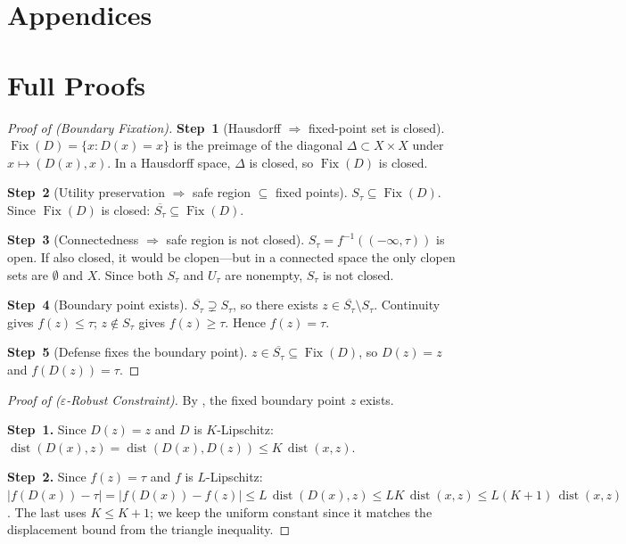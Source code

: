 \documentclass[11pt]{article}
\newcommand{\cl}[1]{\overline{#1}}
\newcommand{\Fix}{\operatorname{Fix}}
\newcommand{\dist}{\operatorname{dist}}
\begin{document}
\newpage
\appendix
\section*{Appendices}

\section{Full Proofs}
\label{app:proofs}

\begin{proof}[Proof of  (Boundary Fixation)]
\textbf{Step~1} (Hausdorff $\Rightarrow$ fixed-point set is closed).
$\Fix(D) = \{x : D(x) = x\}$ is the preimage of the diagonal
$\Delta \subset X \times X$ under $x \mapsto (D(x), x)$. In a
Hausdorff space, $\Delta$ is closed, so $\Fix(D)$ is closed.

\textbf{Step~2} (Utility preservation $\Rightarrow$ safe region
$\subseteq$ fixed points).
$S_\tau \subseteq \Fix(D)$. Since $\Fix(D)$ is closed:
$\cl{S_\tau} \subseteq \Fix(D)$.

\textbf{Step~3} (Connectedness $\Rightarrow$ safe region is not closed).
$S_\tau = f^{-1}((-\infty,\tau))$ is open. If also closed, it would be
clopen---but in a connected space the only clopen sets are $\emptyset$
and $X$. Since both $S_\tau$ and $U_\tau$ are nonempty, $S_\tau$ is not
closed.

\textbf{Step~4} (Boundary point exists).
$\cl{S_\tau} \supsetneq S_\tau$, so there exists
$z \in \cl{S_\tau} \setminus S_\tau$. Continuity gives
$f(z) \leq \tau$; $z \notin S_\tau$ gives $f(z) \geq \tau$. Hence
$f(z) = \tau$.

\textbf{Step~5} (Defense fixes the boundary point).
$z \in \cl{S_\tau} \subseteq \Fix(D)$, so $D(z) = z$ and
$f(D(z)) = \tau$.
\end{proof}

\begin{proof}[Proof of  ($\varepsilon$-Robust Constraint)]
By , the fixed boundary point $z$ exists.

\textbf{Step~1.} Since $D(z) = z$ and $D$ is $K$-Lipschitz:
$\dist(D(x), z) = \dist(D(x), D(z)) \leq K\,\dist(x, z)$.

\textbf{Step~2.} Since $f(z) = \tau$ and $f$ is $L$-Lipschitz:
$|f(D(x)) - \tau| = |f(D(x)) - f(z)| \leq L\,\dist(D(x), z) \leq
LK\,\dist(x, z) \leq L(K{+}1)\,\dist(x,z)$.
The last uses $K \leq K{+}1$; we keep the uniform constant since it
matches the displacement bound from the triangle inequality.
\end{proof}
\end{document}
